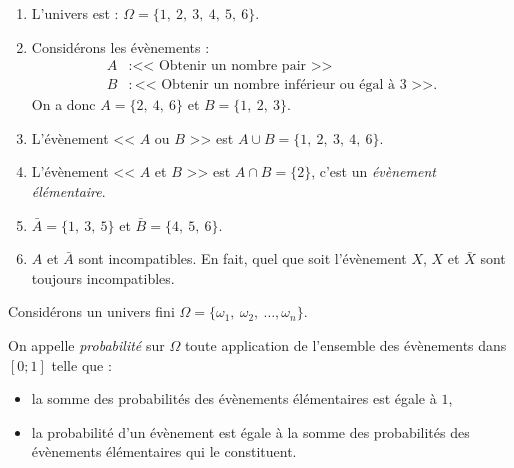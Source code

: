 \begin{defi}
\begin{ex}
                        \begin{enumerate}
                              \item L'univers est : $\Omega = \{1,\ 2,\ 3,\ 4,\ 5,\ 6 \}$.
                              \item Consid\'erons les \'ev\`enements : 
                                    \begin{align*}
                                    A &: \text{<< Obtenir un nombre pair >>} \\
                                    B &: \text{<< Obtenir un nombre inf\'erieur ou \'egal \`a 3 >>} .
                                    \end{align*}
                                    On a donc $A = \{ 2,\ 4,\ 6 \}$ et $B = \{ 1,\ 2,\ 3 \}$.
                              \item L'\'ev\`enement << $A$ ou $B$ >> est $A \cup B = \{ 1,\ 2,\ 3,\ 4,\ 6 \}$.
                              \item L'\'ev\`enement << $A$ et $B$ >> est $A \cap B = \{ 2 \}$, 
                                    c'est un \emph{\'ev\`enement \'el\'ementaire}.
                              \item $\bar{A} = \{ 1,\ 3,\ 5 \}$ et $\bar{B} = \{ 4,\ 5,\ 6 \} $.
                              \item $A$ et $\bar{A}$ sont incompatibles.
                                    En fait, quel que soit l'\'ev\`enement $X$, $X$ et $\bar{X}$ sont toujours incompatibles.
                        \end{enumerate}
                  \end{ex}
            \end{defi}
      Consid\'erons un univers fini $\Omega = \{ \omega_1,\ \omega_2,\ \ldots ,\omega_n \}$.
      \begin{defi}[Probabilit\'e]
            On appelle \emph{probabilit\'e} sur $\Omega$ toute application 
            de l'ensemble des \'ev\`enements dans $[0 ; 1]$ telle que : 
            \begin{itemize}
                  \item la somme des probabilit\'es des \'ev\`enements \'el\'ementaires est \'egale \`a $1$,
                  \item la probabilit\'e d'un \'ev\`enement est \'egale \`a la somme des probabilit\'es
                        des \'ev\`enements \'el\'ementaires qui le constituent.
            \end{itemize}
      \end{defi}
